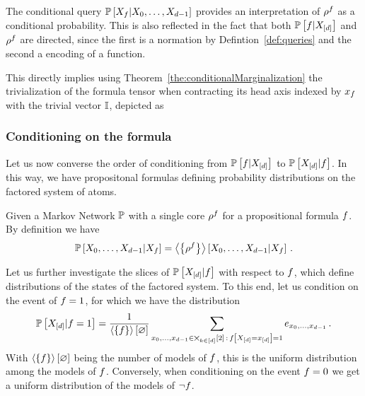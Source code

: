 The conditional query $\mathbb{P}\left[X_{f}|X_{0},\ldots,X_{d-1}\right]$ provides an interpretation of $\rho^{f}$ as a conditional probability. 
This is also reflected in the fact that both $\mathbb{P}\left[f|X_{[d]}\right]$ and $\rho^{f}$ are directed, since the first is a normation by Defintion~\ref{def:queries} and the second a encoding of a function.



This directly implies using Theorem~\ref{the:conditionalMarginalization}  the trivialization of the formula tensor when contracting its head axis indexed by $x_{f}$ with the trivial vector $\mathbb{I}$, depicted as
\begin{center}
	
\end{center}



\subsubsection{Conditioning on the formula}

Let us now converse the order of conditioning from $\mathbb{P}\left[f|X_{[d]}\right]$ to $\mathbb{P}\left[X_{[d]}|f\right]$.
In this way, we have propositonal formulas defining probability distributions on the factored system of atoms.

Given a Markov Network $\mathbb{P}$ with a single core $\rho^{f}$ for a propositional formula $f$.
By definition we have
\begin{align*}
	\mathbb{P}\left[X_{0},\ldots,X_{d-1}|X_{f}\right] 
	= \left\langle \left\{\rho^{f}\right\}\right\rangle \left[ X_{0},\ldots,X_{d-1} | X_{f} \right] \, .  
\end{align*}
\begin{center}
	
\end{center}

Let us further investigate the slices of $\mathbb{P}\left[X_{[d]}|f\right]$ with respect to $f$, which define distributions of the states of the factored system.
To this end, let us condition on the event of $f=1$, for which we have the distribution
\begin{align}\label{eq:eventFormulaProb}
	\mathbb{P}\left[X_{[d]}|f=1\right] = \frac{1}{\left\langle \left\{f\right\}\right\rangle \left[ \varnothing \right]} \sum_{{x_{0},\ldots,x_{d-1}} \in \bigtimes_{k\in[d]}[2] \, : \, f\left[X_{[d]}=x_{[d]}\right]=1} e_{{x_{0},\ldots,x_{d-1}}} \, .
\end{align}
With $\left\langle \left\{f\right\}\right\rangle \left[ \varnothing \right]$ being the number of models of $f$,  this is the uniform distribution among the models of $f$.
Conversely, when conditioning on the event $f=0$ we get a uniform distribution of the models of $\lnot f$.

